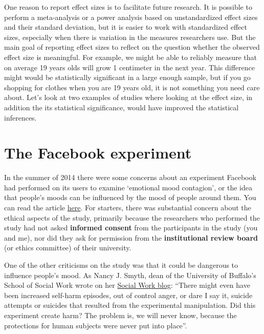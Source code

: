 \documentclass[
]{krantz}
\begin{document}
One reason to report effect sizes is to facilitate future research. It is possible to perform a meta-analysis or a power analysis based on unstandardized effect sizes and their standard deviation, but it is easier to work with standardized effect sizes, especially when there is variation in the measures researchers use. But the main goal of reporting effect sizes to reflect on the question whether the observed effect size is meaningful. For example, we might be able to reliably measure that on average 19 years olds will grow 1 centimeter in the next year. This difference might would be statistically significant in a large enough sample, but if you go shopping for clothes when you are 19 years old, it is not something you need care about. Let's look at two examples of studies where looking at the effect size, in addition the its statistical significance, would have improved the statistical inferences.

\hypertarget{the-facebook-experiment}{%
\section{The Facebook experiment}\label{the-facebook-experiment}}

In the summer of 2014 there were some concerns about an experiment Facebook had performed on its users to examine `emotional mood contagion', or the idea that people's moods can be influenced by the mood of people around them. You can read the article \href{http://www.pnas.org/content/111/24/8788.full}{here}. For starters, there was substantial concern about the ethical aspects of the study, primarily because the researchers who performed the study had not asked \textbf{informed consent} from the participants in the study (you and me), nor did they ask for permission from the \textbf{institutional review board} (or ethics committee) of their university.

One of the other criticisms on the study was that it could be dangerous to influence people's mood. As Nancy J. Smyth, dean of the University of Buffalo's School of Social Work wrote on her \href{https://njsmyth.wordpress.com/2014/06/29/did-facebooks-secret-mood-manipulation-experiment-create-harm/}{Social Work blog}: ``There might even have been increased self-harm episodes, out of control anger, or dare I say it, suicide attempts or suicides that resulted from the experimental manipulation. Did this experiment create harm? The problem is, we will never know, because the protections for human subjects were never put into place''.
\end{document}
